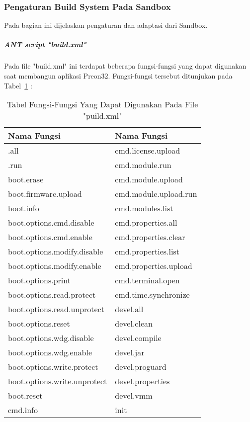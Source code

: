 \subsubsection{Pengaturan Build System Pada Sandbox}
Pada bagian ini dijelaskan pengaturan dan adaptasi dari Sandbox. 
\subparagraph{ANT script "build.xml"}
Pada file "build.xml" ini terdapat beberapa fungsi-fungsi yang dapat digunakan saat membangun aplikasi Preon32. Fungsi-fungsi tersebut ditunjukan pada Tabel~\ref{tab:build_xml} :
\begin{table}[H] %
	\centering 
	\caption{Tabel Fungsi-Fungsi Yang Dapat Digunakan Pada File "puild.xml"}
	\label{tab:build_xml}
	\begin{tabular}{|p{7cm}|p{7cm}|}
		\hline
		Nama Fungsi & Nama Fungsi \\

		\hline
		.all & cmd.license.upload \\
		.run  & cmd.module.run \\
		boot.erase & cmd.module.upload\\
		boot.firmware.upload & cmd.module.upload.run \\
		boot.info & cmd.modules.list\\
		boot.options.cmd.disable & cmd.properties.all\\
		boot.options.cmd.enable & cmd.properties.clear \\
		boot.options.modify.disable & cmd.properties.list\\
		boot.options.modify.enable & cmd.properties.upload\\
		boot.options.print & cmd.terminal.open\\
		boot.options.read.protect & cmd.time.synchronize\\
		boot.options.read.unprotect & devel.all\\
		boot.options.reset & devel.clean\\
		boot.options.wdg.disable & devel.compile\\
		boot.options.wdg.enable & devel.jar\\
		boot.options.write.protect & devel.proguard\\
		boot.options.write.unprotect & devel.properties\\
		boot.reset & devel.vmm\\
		cmd.info & init\\
		\hline
	\end{tabular} 
\end{table}	

